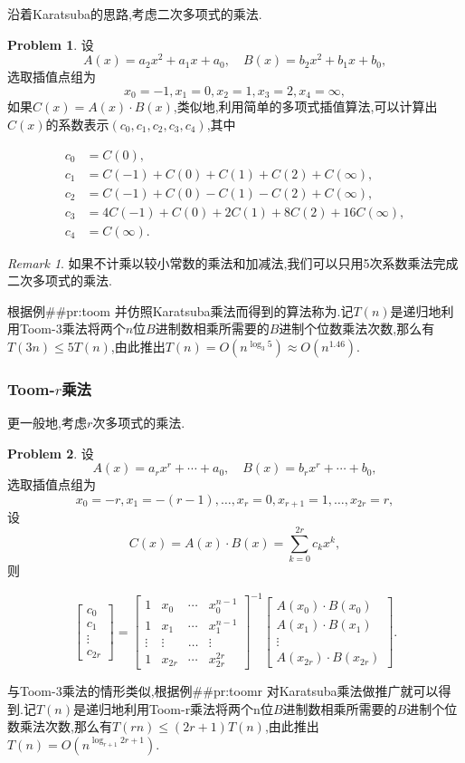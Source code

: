 \documentclass{ctexart}
\theoremstyle{remark}
\newtheorem{remark}{Remark}
\theoremstyle{definition}
\newtheorem{problem}{Problem}
\begin{document}
沿着Karatsuba的思路,考虑二次多项式的乘法.
\begin{problem}\label{pr:toom}
设$$A(x)=a_2x^2+a_1x+a_0,\quad B(x)=b_2x^2+b_1x+b_0,$$选取插值点组为$$x_0=-1,x_1=0,x_2=1,x_3=2,x_4=\infty,$$如果$C(x)=A(x)\cdot B(x)$,类似地,利用简单的多项式插值算法,可以计算出$C(x) $的系数表示$(c_0,c_1,c_2,c_3,c_4)$,其中

\begin{align*}
c_0&=C(0),\\
c_1&=C(-1)+C(0)+C(1)+C(2)+C(\infty),\\
c_2&=C(-1)+C(0)-C(1)-C(2)+C(\infty),\\
c_3&=4C(-1)+C(0)+2C(1)+8C(2)+16C(\infty),\\
c_4&=C(\infty).
\end{align*}

\end{problem}
\begin{remark}
如果不计乘以较小常数的乘法和加减法,我们可以只用5次系数乘法完成二次多项式的乘法.
\end{remark}
根据例##pr:toom 并仿照Karatsuba乘法而得到的算法称为.记$T(n)$是递归地利用Toom-3乘法将两个$n$位$B$进制数相乘所需要的$B$进制个位数乘法次数,那么有$T(3n)\le 5T(n)$,由此推出$T(n)=O(n^{\log_3{5}})\approx O(n^{1.46})$.

\subsubsection{Toom-$r$乘法}

更一般地,考虑$r$次多项式的乘法.
\begin{problem}\label{pr:toomr}
设$$A(x)=a_rx^r+\cdots+a_0,\quad B(x)=b_rx^r+\cdots+b_0,$$选取插值点组为$$x_0=-r,x_1=-(r-1),\ldots,x_r=0,x_{r+1}=1,\ldots,x_{2r}=r,$$设$$C(x)=A(x)\cdot B(x)=\sum_{k=0}^{2r}c_kx^k,$$则

\begin{equation*}
  \begin{bmatrix}
    c_0\\
    c_1\\
    \vdots\\
    c_{2r}
  \end{bmatrix}
=
  \begin{bmatrix}
    1 & x_0 & \cdots & x_0^{n-1}\\
    1 & x_1 & \cdots & x_1^{n-1}\\
    \vdots & \vdots & \ldots & \vdots\\
    1 & x_{2r} & \cdots & x_{2r}^{2r}
  \end{bmatrix}
^{-1}
  \begin{bmatrix}
    A(x_0)\cdot B(x_0)\\
    A(x_1)\cdot B(x_1)\\
    \vdots\\
    A(x_{2r})\cdot B(x_{2r})
  \end{bmatrix}.
\end{equation*}

\end{problem}
与Toom-3乘法的情形类似,根据例##pr:toomr 对Karatsuba乘法做推广就可以得到.记$T(n)$是递归地利用Toom-r乘法将两个n位$B$进制数相乘所需要的$B$进制个位数乘法次数,那么有$T(rn)\le (2r+1)T(n)$,由此推出$T(n)=O(n^{\log_{r+1}{2r+1}})$.
\end{document}
